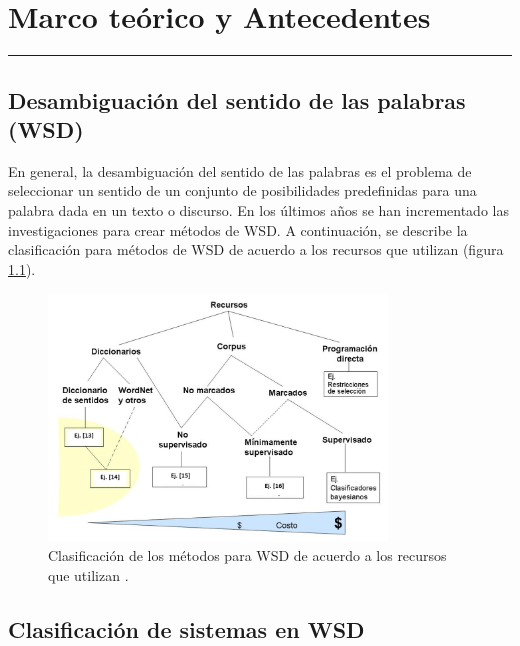 \chapter{Marco teórico y Antecedentes }
\hrule \bigskip \vspace*{1cm}

\section{Desambiguación del sentido de las palabras (WSD)}
En general, la desambiguación del sentido de las palabras es el problema de seleccionar un sentido de un conjunto de posibilidades predefinidas para una palabra dada en un texto o discurso.
En los últimos años se han incrementado las investigaciones para crear métodos de WSD. A continuación, se describe la clasificación para métodos de WSD de acuerdo a los recursos que utilizan (figura \ref{fig:desambiguacion_WSD}).

  \begin{figure}[h!]
	  \begin{center}
    \includegraphics[angle=0, width=9cm]{Graficos/desambiguacion_WSD}
	  \caption{Clasificación de los métodos para WSD de acuerdo a los recursos que utilizan \cite{001}.}
    \label{fig:desambiguacion_WSD}
    \end{center}
	\end{figure}

\section{Clasificación de sistemas en WSD}
